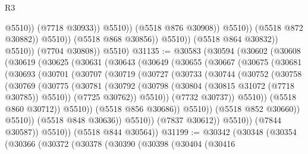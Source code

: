 \begin{lexlean}{R3}
\begin{coremodule}
                                          @5510))
                                      (@7718 @30933))
                                    @5510))
                                (@5518 @876 @30908))
                              @5510))
                          (@5518 @872 @30882))
                        @5510))
                    (@5518 @868 @30856))
                  @5510))
              (@5518 @864 @30832))
            @5510))
        (@7704 @30808))
      @5510)
@31135 := @30583
    (@30594
      (@30602
        (@30608
          (@30619
            (@30625
              (@30631
                (@30643
                  (@30649
                    (@30655
                      (@30667
                        (@30675
                          (@30681
                            (@30693
                              (@30701
                                (@30707
                                  (@30719
                                    (@30727
                                      (@30733
                                        (@30744
                                          (@30752
                                            (@30758
                                              (@30769
                                                (@30775
                                                  (@30781
                                                    (@30792
                                                      (@30798
                                                        (@30804
                                                          (@30815 @31072 (@7718 @30785))
                                                          @5510))
                                                      (@7725 @30762))
                                                    @5510))
                                                (@7732 @30737))
                                              @5510))
                                          (@5518 @860 @30712))
                                        @5510))
                                    (@5518 @856 @30686))
                                  @5510))
                              (@5518 @852 @30660))
                            @5510))
                        (@5518 @848 @30636))
                      @5510))
                  (@7837 @30612))
                @5510))
            (@7844 @30587))
          @5510))
      (@5518 @844 @30564))
@31199 := @30342
    (@30348
      (@30354
        (@30366
          (@30372
            (@30378
              (@30390
                (@30398
                  (@30404
                    (@30416

\end{coremodule}
\end{lexlean}
